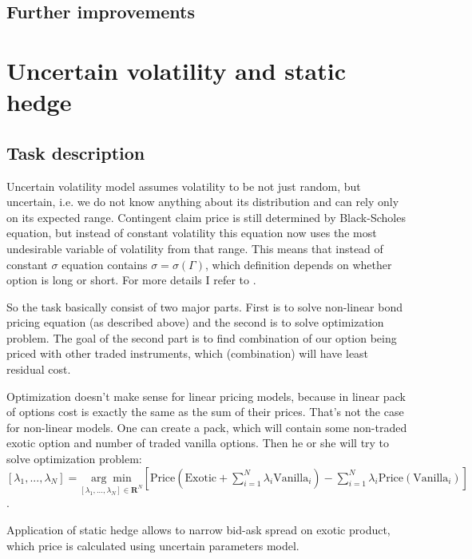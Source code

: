 \documentclass[11pt]{article} %
\begin{document}

\subsection{Further improvements}


\section{Uncertain volatility and static hedge}
\subsection{Task description}
Uncertain volatility model assumes volatility to be not just random, but uncertain, i.e. we do not know anything about its distribution and can rely only on its expected range. Contingent claim price is still determined by Black-Scholes equation, but instead of constant volatility this equation now uses the most undesirable variable of volatility from that range. This means that instead of constant $\sigma$ equation contains $\sigma = \sigma(\Gamma)$, which definition depends on whether option is long or short. For more details I refer to \cite[ch. 52 and 60]{PWoQF06}.

So the task basically consist of two major parts. First is to solve non-linear bond pricing equation (as described above) and the second is to solve optimization problem. The goal of the second part is to find combination of our option being priced with other traded instruments, which (combination) will have least residual cost. 

Optimization doesn't make sense for linear pricing models, because in linear pack of options cost is exactly the same as the sum of their prices. That's not the case for non-linear models. One can create a pack, which will contain some non-traded exotic option and number of traded vanilla options. Then he or she will try to solve optimization problem:\\ $[\lambda_1, ..., \lambda_N] = \underset{[\lambda_1, ..., \lambda_N]\in \mathbf{R}^N}{\arg \min} \left[\text{Price}\left(\text{Exotic} + \sum_{i=1}^{N}\lambda_i \text{Vanilla}_i\right) - \sum_{i=1}^N\lambda_i\text{Price}\left(\text{Vanilla}_i\right) \right]$.

Application of static hedge allows to narrow bid-ask spread on exotic product, which price is calculated using uncertain parameters model.
\end{document}
